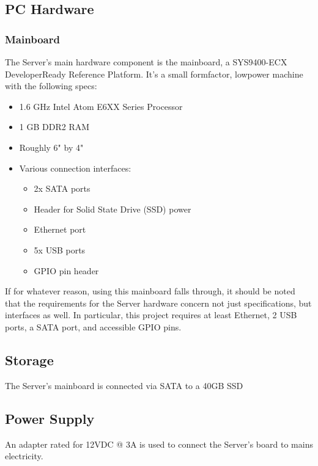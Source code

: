 
\subsection{PC Hardware}

\subsubsection{Mainboard}
The Server's main hardware component is the mainboard, a SYS9400-ECX Developer\-Ready
Reference Platform. It's a small form\-factor, low\-power machine with the following specs:

\begin{itemize}
	\item 1.6 GHz Intel Atom E6XX Series Processor
	\item 1 GB DDR2 RAM
	\item Roughly 6" by 4"
	\item Various connection interfaces:
	\begin{itemize}
		\item 2x SATA ports
		\item Header for Solid State Drive (SSD) power
		\item Ethernet port
		\item 5x USB ports
		\item GPIO pin header
	\end{itemize}
\end{itemize}

If for whatever reason, using this mainboard falls through, it should be noted that the
requirements for the Server hardware concern not just specifications, but interfaces as well.
In particular, this project requires at least Ethernet, 2 USB ports, a SATA port, and accessible
GPIO pins.
\subsection{Storage}
The Server's mainboard is connected via SATA to a 40GB SSD

\subsection{Power Supply}
An adapter rated for 12VDC @ 3A is used to connect the Server's board to mains electricity.
